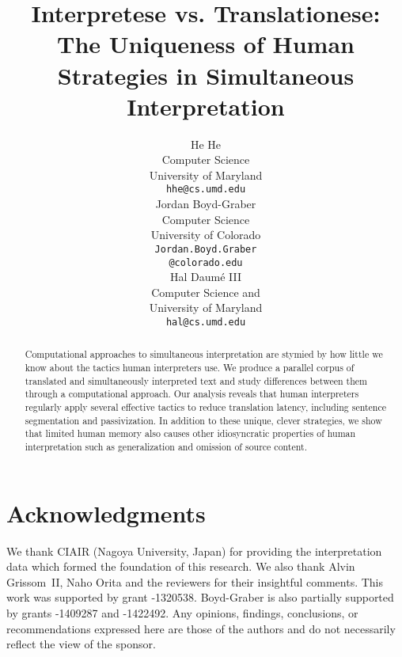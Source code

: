 \documentclass[11pt]{article}
\title{Interpretese vs. Translationese: \\ The Uniqueness of Human Strategies in Simultaneous Interpretation}
\author{He He \\
  Computer Science \\
  University of Maryland \\
  {\tt hhe@cs.umd.edu} \\\And
  Jordan Boyd-Graber \\
  Computer Science \\
  University of Colorado \\
{\tt Jordan.Boyd.Graber} \\
   {\tt @colorado.edu} \\ \And
  Hal {Daum\'e III} \\
  Computer Science and \abr{umiacs} \\
  University of Maryland \\
  {\tt hal@cs.umd.edu}}
\date{}
\begin{document}
\maketitle
\begin{abstract}
  Computational approaches to simultaneous interpretation are stymied
  by how little we know about the tactics human interpreters use. We
  produce a parallel corpus of translated and simultaneously
  interpreted text and study differences between them through a
  computational approach.  Our analysis reveals that human
  interpreters regularly apply several effective tactics to reduce
  translation latency, including sentence segmentation and
  passivization.  In addition to these unique, clever strategies, we
  show that limited human memory also causes other idiosyncratic
  properties of human interpretation such as generalization and
  omission of source content.
\end{abstract}







\section*{Acknowledgments}

We thank CIAIR (Nagoya University, Japan) for providing the interpretation data which
formed the foundation of this research.
We also thank Alvin Grissom~II, Naho Orita and the reviewers for their insightful comments.
This work was supported by
 grant -1320538.  Boyd-Graber is also partially
supported by  grants -1409287 and
-1422492. Any opinions, findings,
conclusions, or recommendations expressed here are those of the
authors and do not necessarily reflect the view of the sponsor.




\end{document}
